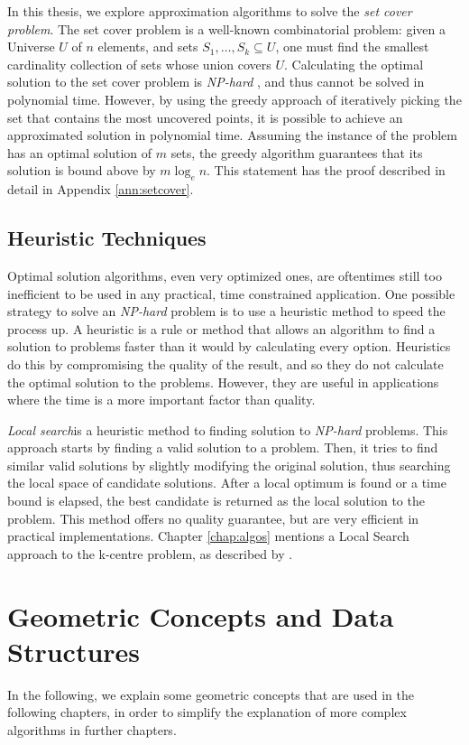 In this thesis, we explore approximation algorithms to solve the \emph{set cover problem}. The set cover problem is a well-known combinatorial problem: given a Universe $U$ of $n$ elements, and sets $S_1,\dotsc,S_k \subseteq U$, one must find the smallest cardinality collection of sets whose union covers $U$. Calculating the optimal solution to the set cover problem is \emph{NP-hard} \cite{gdccomplex}, and thus cannot be solved in polynomial time. However, by using the greedy approach of iteratively picking the set that contains the most uncovered points, it is possible to achieve an approximated solution in polynomial time. Assuming the instance of the problem has an optimal solution of $m$ sets, the greedy algorithm guarantees that its solution is bound above by $m \log_e n$. This statement has the proof described in detail in Appendix \ref{ann:setcover}.

\subsection{Heuristic Techniques}
Optimal solution algorithms, even very optimized ones, are oftentimes still too inefficient to be used in any practical, time constrained application. One possible strategy to solve an \emph{NP-hard} problem is to use a heuristic method to speed the process up. A heuristic is a rule or method that allows an algorithm to find a solution to problems faster than it would by calculating every option. Heuristics do this by compromising the quality of the result, and so they do not calculate the optimal solution to the problems. However, they are useful in applications where the time is a more important factor than quality.

\emph{Local search}is a heuristic method to finding solution to \emph{NP-hard} problems. This approach starts by finding a valid solution to a problem. Then, it tries to find similar valid solutions by slightly modifying the original solution, thus searching the local space of candidate solutions. After a local optimum is found or a time bound is elapsed, the best candidate is returned as the local solution to the problem. This method offers no quality guarantee, but are very efficient in practical implementations. Chapter \ref{chap:algos} mentions a Local Search approach to the k-centre problem, as described by \citet{incrementalcov}.

\section{Geometric Concepts and Data Structures}
In the following, we explain some geometric concepts that are used in the following chapters, in order to simplify the explanation of more complex algorithms in further chapters.
